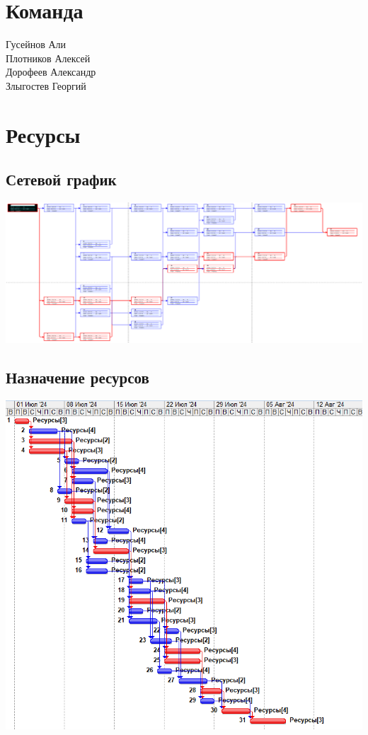 \documentclass[14pt]{article}
\begin{document}

\clearpage
\tableofcontents
\clearpage
\section{Команда}
	Гусейнов Али\\
	Плотников Алексей\\
	Дорофеев Александр\\
	Злыгостев Георгий
\section{Ресурсы}
	\subsection{Сетевой график}
	\includegraphics[width=\textwidth]{../img/init_network_graph.png}
	\subsection{Назначение ресурсов}
	\includegraphics[width=\textwidth]{../img/init_resource_manage.png}
\end{document}

